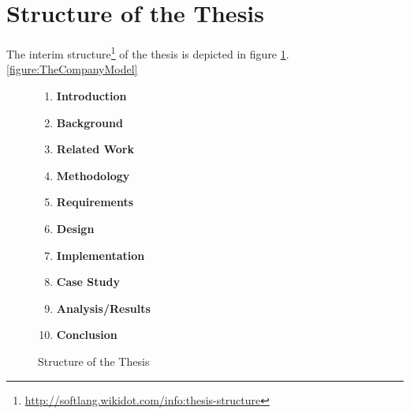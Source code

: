 \documentclass[runningheads,a4paper]{llncs}
\newcommand{\footnoteurl}[1]{\footnote{\url{#1}}}
\begin{document}
\section{Structure of the Thesis}
\label{section:StructureOfTheThesis}
The interim structure\footnoteurl{http://softlang.wikidot.com/info:thesis-structure} of the thesis is depicted in figure \ref{figure:StructureOfTheThesis}.
\ref{figure:TheCompanyModel}

\begin{figure}[h!]
\begin{center}
\begin{minipage}[t]{0.5\textwidth}
\begin{enumerate}

\item
\textbf{Introduction}

\item
\textbf{Background}

\item
\textbf{Related Work}

\item
\textbf{Methodology}

\item
\textbf{Requirements}

\item
\textbf{Design}

\item
\textbf{Implementation}

\item
\textbf{Case Study}

\item
\textbf{Analysis/Results}

\item
\textbf{Conclusion}

\end{enumerate}
\end{minipage}
\end{center}
\caption{Structure of the Thesis}
\label{figure:StructureOfTheThesis}
\end{figure}





\cite{DBLP:conf/ecmdafa/LammelV14}
\cite{DBLP:conf/models/FavreLV12}
\cite{DBLP:journals/dke/Varzi96}
\cite{DBLP:journals/entcs/FavreN05}
\cite{Softlang:course/ptt15/technoloymodeling}
\cite{DBLP:conf/sle/Lammel16}


{}

\end{document}
